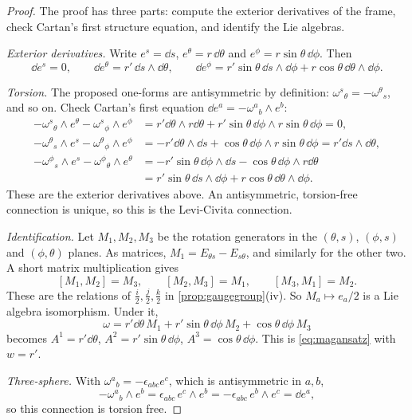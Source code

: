 \begin{proof}
The proof has three parts: compute the exterior derivatives of the frame, check Cartan's first structure equation, and identify the Lie algebras.

\emph{Exterior derivatives.} Write $e^s=\dd s$, $e^\theta=r\,\dd\theta$ and $e^\phi=r\sin\theta\,\dd\phi$. Then
\[
\dd e^s=0,\qquad\dd e^\theta=r'\,\dd s\wedge\dd\theta,\qquad\dd e^\phi=r'\sin\theta\,\dd s\wedge\dd\phi+r\cos\theta\,\dd\theta\wedge\dd\phi .
\]

\emph{Torsion.} The proposed one-forms are antisymmetric by definition: $\omega^s{}_\theta=-\omega^\theta{}_s$, and so on. Check Cartan's first equation $\dd e^a=-\omega^a{}_b\wedge e^b$:
\begin{align*}
-\omega^s{}_\theta\wedge e^\theta-\omega^s{}_\phi\wedge e^\phi&=r'\dd\theta\wedge r\dd\theta+r'\sin\theta\,\dd\phi\wedge r\sin\theta\,\dd\phi=0,\\
-\omega^\theta{}_s\wedge e^s-\omega^\theta{}_\phi\wedge e^\phi&=-r'\dd\theta\wedge\dd s+\cos\theta\,\dd\phi\wedge r\sin\theta\,\dd\phi=r'\dd s\wedge\dd\theta,\\
-\omega^\phi{}_s\wedge e^s-\omega^\phi{}_\theta\wedge e^\theta&=-r'\sin\theta\,\dd\phi\wedge\dd s-\cos\theta\,\dd\phi\wedge r\dd\theta\\
&=r'\sin\theta\,\dd s\wedge\dd\phi+r\cos\theta\,\dd\theta\wedge\dd\phi .
\end{align*}
These are the exterior derivatives above. An antisymmetric, torsion-free connection is unique, so this is the Levi-Civita connection.

\emph{Identification.} Let $M_1,M_2,M_3$ be the rotation generators in the $(\theta,s)$, $(\phi,s)$ and $(\phi,\theta)$ planes. As matrices, $M_1=E_{\theta s}-E_{s\theta}$, and similarly for the other two. A short matrix multiplication gives
\[
[M_1,M_2]=M_3,\qquad[M_2,M_3]=M_1,\qquad[M_3,M_1]=M_2 .
\]
These are the relations of $\frac i2,\frac j2,\frac k2$ in \cref{prop:gaugegroup}(iv). So $M_a\mapsto e_a/2$ is a Lie algebra isomorphism. Under it,
\[
\omega=r'\dd\theta\,M_1+r'\sin\theta\,\dd\phi\,M_2+\cos\theta\,\dd\phi\,M_3
\]
becomes $A^1=r'\dd\theta$, $A^2=r'\sin\theta\,\dd\phi$, $A^3=\cos\theta\,\dd\phi$. This is \eqref{eq:magansatz} with $w=r'$.

\emph{Three-sphere.} With $\omega^a{}_b=-\epsilon_{abc}e^c$, which is antisymmetric in $a,b$,
\[
-\omega^a{}_b\wedge e^b=\epsilon_{abc}\,e^c\wedge e^b=-\epsilon_{abc}\,e^b\wedge e^c=\dd e^a ,
\]
so this connection is torsion free.
\end{proof}



